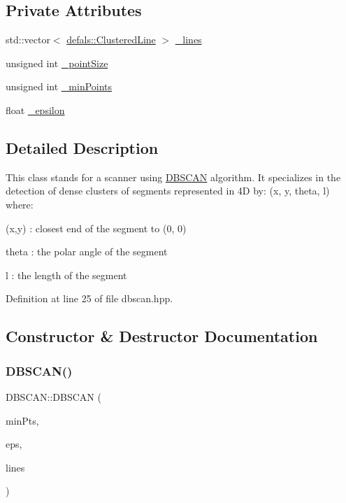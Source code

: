 \subsection*{Private Attributes}
\begin{DoxyCompactItemize}
\item 
std\+::vector$<$ \hyperlink{classdefals_1_1_clustered_line}{defals\+::\+Clustered\+Line} $>$ \hyperlink{class_d_b_s_c_a_n_af7e2429a85e2246405d78e968435c910}{\+\_\+lines}
\item 
unsigned int \hyperlink{class_d_b_s_c_a_n_af45306ee35215b8c0be32b04f176d49d}{\+\_\+point\+Size}
\item 
unsigned int \hyperlink{class_d_b_s_c_a_n_a5bd2e6ab5316035d7b5448d00f4108e5}{\+\_\+min\+Points}
\item 
float \hyperlink{class_d_b_s_c_a_n_a4e9de40c172ec17ad4b291d5ea71466a}{\+\_\+epsilon}
\end{DoxyCompactItemize}


\subsection{Detailed Description}
This class stands for a scanner using \hyperlink{class_d_b_s_c_a_n}{D\+B\+S\+C\+AN} algorithm. It specializes in the detection of dense clusters of segments represented in 4D by\+: (x, y, theta, l) where\+:
\begin{DoxyItemize}
\item (x,y) \+: closest end of the segment to (0, 0)
\item theta \+: the polar angle of the segment
\item l \+: the length of the segment 
\end{DoxyItemize}

Definition at line 25 of file dbscan.\+hpp.



\subsection{Constructor \& Destructor Documentation}
\mbox{\label{class_d_b_s_c_a_n_a3cfe5615c80c46d3e309dba2ab506dd7}} 
\subsubsection{\texorpdfstring{D\+B\+S\+C\+A\+N()}{DBSCAN()}}
{\footnotesize\ttfamily D\+B\+S\+C\+A\+N\+::\+D\+B\+S\+C\+AN (\begin{DoxyParamCaption}\item[{unsigned int}]{min\+Pts,  }\item[{float}]{eps,  }\item[{std\+::vector$<$ \hyperlink{classdefals_1_1_clustered_line}{defals\+::\+Clustered\+Line} $>$ \&}]{lines }\end{DoxyParamCaption})}

